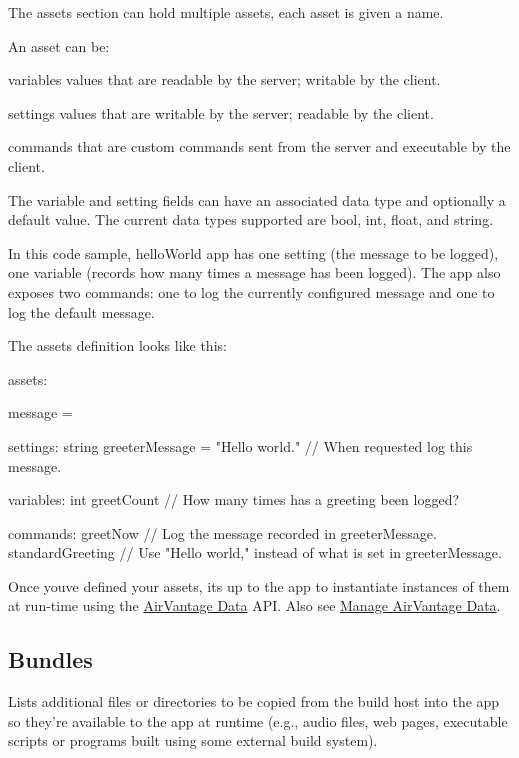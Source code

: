 The assets section can hold multiple assets, each asset is given a name.

An asset can be\+:


\begin{DoxyItemize}
\item {\ttfamily variables} values that are readable by the server; writable by the client.
\item {\ttfamily settings} values that are writable by the server; readable by the client.
\item {\ttfamily commands} that are custom commands sent from the server and executable by the client.
\end{DoxyItemize}

The variable and setting fields can have an associated data type and optionally a default value. The current data types supported are {\ttfamily  bool, int, float, and string}.

In this code sample, {\ttfamily hello\+World} app has one setting (the message to be logged), one variable (records how many times a message has been logged). The app also exposes two commands\+: one to log the currently configured message and one to log the default message.

The {\ttfamily assets} definition looks like this\+:

\begin{DoxyVerb}assets:
{
    message =
    {
        settings:
        {
            string greeterMessage = "Hello world."   // When requested log this message.
        }

        variables:
        {
            int greetCount     // How many times has a greeting been logged?
        }

        commands:
        {
            greetNow           // Log the message recorded in greeterMessage.
            standardGreeting   // Use "Hello world," instead of what is set in greeterMessage.
        }
    }
}
\end{DoxyVerb}


Once you\textquotesingle{}ve defined your assets, it\textquotesingle{}s up to the app to instantiate instances of them at run-\/time using the \hyperlink{c_le_avdata}{Air\+Vantage Data} A\+P\+I. Also see \hyperlink{howToAVData}{Manage Air\+Vantage Data}.\hypertarget{def_files_cdef_defFilesCdef_bundles}{}\subsection{Bundles}\label{def_files_cdef_defFilesCdef_bundles}
Lists additional files or directories to be copied from the build host into the app so they’re available to the app at runtime (e.\+g., audio files, web pages, executable scripts or programs built using some external build system).

